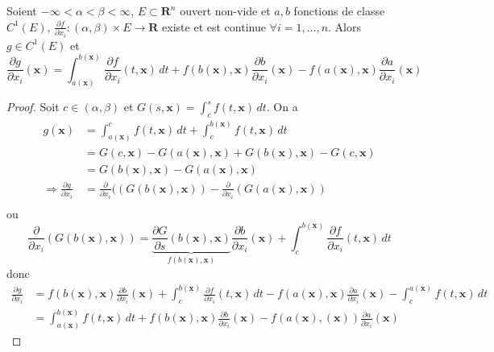 \begin{theorem}
Soient $-\infty<\alpha<\beta<\infty$, $E\subset \mathbf{R}^{n}$ ouvert non-vide et $a,b$ fonctions de classe $C^{1}(E)$, $\frac{ \partial f }{ \partial x_{i} }:(\alpha,\beta)\times E\to \mathbf{R}$ existe et est continue $\forall i=1,\dots,n$. Alors $g\in C^{1}(E)$ et 
$$
\frac{ \partial g }{ \partial x_{i} } (\boldsymbol{x})=\int_{a(\boldsymbol{x})}^{b(\boldsymbol{x})}\frac{ \partial f }{ \partial x_{i} } (t,\boldsymbol{x})  \, dt+f(b(\boldsymbol{x}),\boldsymbol{x}) \frac{ \partial b }{ \partial x_{i} } (\boldsymbol{x})-f(a(\boldsymbol{x}),\boldsymbol{x})\frac{ \partial a }{ \partial x_{i} } (\boldsymbol{x})
$$
\end{theorem}
\begin{proof}
Soit $c\in(\alpha,\beta)$ et $G(s,\boldsymbol{x})=\int_{c}^{s} f(t,\boldsymbol{x}) \, dt$. On a
\begin{align*}
g(\boldsymbol{x}) & =\int_{a(\boldsymbol{x})}^{c} f(t,\boldsymbol{x}) \, dt+\int_{c}^{b(\boldsymbol{x})} f(t,\boldsymbol{x}) \, dt \\
  & =G(c,\boldsymbol{x})-G(a(\boldsymbol{x}),\boldsymbol{x}) +G(b(\boldsymbol{x}),\boldsymbol{x})-G(c,\boldsymbol{x}) \\
 & =G(b(\boldsymbol{x}),\boldsymbol{x})-G(a(\boldsymbol{x}),\boldsymbol{x}) \\
\Rightarrow \frac{ \partial g }{ \partial x_{i} }  & =\frac{ \partial  }{ \partial x_{i} } ((G(b(\boldsymbol{x}),\boldsymbol{x}))-\frac{ \partial  }{ \partial x_{i} } (G(a(\boldsymbol{x}),\boldsymbol{x})) \\
\end{align*}
ou
$$
\frac{ \partial  }{ \partial x_{i} } (G(b(\boldsymbol{x}),\boldsymbol{x}))=\underbrace{ \frac{ \partial G }{ \partial s } (b(\boldsymbol{x}),\boldsymbol{x}) }_{ f(b(\boldsymbol{x}),\boldsymbol{x}) }\frac{ \partial b }{ \partial x_{i} } (\boldsymbol{x})+\int_{c}^{b(\boldsymbol{x})} \frac{ \partial f }{ \partial x_{i} } (t,\boldsymbol{x})  \, dt 
$$
donc
\begin{align*}
\frac{ \partial g }{ \partial x_{i} }  & =f(b(\boldsymbol{x}),\boldsymbol{x})\frac{ \partial b }{ \partial x_{i} } (\boldsymbol{x})+\int_{c}^{b(\boldsymbol{x})} \frac{ \partial f }{ \partial x_{i} } (t,\boldsymbol{x})  \, dt-f(a(\boldsymbol{x}),\boldsymbol{x})\frac{ \partial a }{ \partial x_{i} } (\boldsymbol{x})-\int_{c}^{a(\boldsymbol{x})} f(t,\boldsymbol{x}) \, dt \\
 &= \int_{a(\boldsymbol{x})}^{b(\boldsymbol{x})} f(t,\boldsymbol{x}) \, dt+f(b(\boldsymbol{x}),\boldsymbol{x} )\frac{ \partial b }{ \partial x_{i} } (\boldsymbol{x})-f(a(\boldsymbol{x}),\boldsymbol{(x)})\frac{ \partial a }{ \partial x_{i} } (\boldsymbol{x}) 
\end{align*}
\end{proof}
